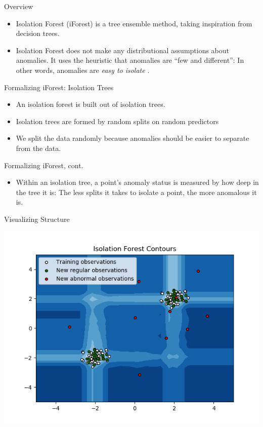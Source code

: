 \documentclass{beamer}
\begin{document}
\begin{frame}{Overview}
    \begin{itemize}
        \item Isolation Forest (iForest) is a tree ensemble method, taking
            inspiration from decision trees.
        \item Isolation Forest does not make any distributional assumptions
            about anomalies. It uses the heuristic that anomalies are ``few and
            different'': In other words, anomalies are \textit{easy to isolate}
            \cite{liu2009}.
    \end{itemize}
\end{frame}

\begin{frame}{Formalizing iForest: Isolation Trees}
    \begin{itemize}
        \item An isolation forest is built out of isolation trees.
        \item Isolation trees are formed by random splits on random predictors
        \item We split the data randomly because anomalies should be easier to
            separate from the data.
    \end{itemize}
\end{frame}

\begin{frame}{Formalizing iForest, cont.}
    \begin{itemize}
        \item Within an isolation tree, a point's anomaly status is measured by
            how deep in the tree it is: The less splits it takes to isolate a
            point, the more anomalous it is.
    \end{itemize}
\end{frame}

\begin{frame}{Visualizing Structure}
    \begin{center}
        \includegraphics[width=\textwidth]{example_visualization}
    \end{center}
\end{frame}
\end{document}
